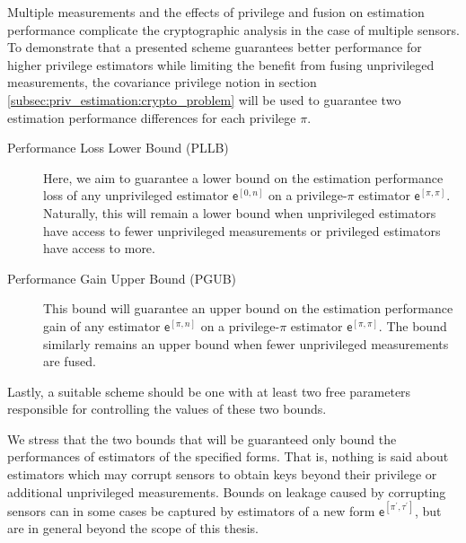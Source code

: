 Multiple measurements and the effects of privilege and fusion on estimation performance complicate the cryptographic analysis in the case of multiple sensors. To demonstrate that a presented scheme guarantees better performance for higher privilege estimators while limiting the benefit from fusing unprivileged measurements, the covariance privilege notion in section \ref{subsec:priv_estimation:crypto_problem} will be used to guarantee two estimation performance differences for each privilege $\pi$.
\begin{description}
    \item[Performance Loss Lower Bound (PLLB)] Here, we aim to guarantee a lower bound on the estimation performance loss of any unprivileged estimator $\mathsf{e}^{[0, n]}$ on a privilege-$\pi$ estimator $\mathsf{e}^{[\pi,\pi]}$. Naturally, this will remain a lower bound when unprivileged estimators have access to fewer unprivileged measurements or privileged estimators have access to more.
    \item[Performance Gain Upper Bound (PGUB)] This bound will guarantee an upper bound on the estimation performance gain of any estimator $\mathsf{e}^{[\pi, n]}$ on a privilege-$\pi$ estimator $\mathsf{e}^{[\pi,\pi]}$. The bound similarly remains an upper bound when fewer unprivileged measurements are fused.
\end{description}
Lastly, a suitable scheme should be one with at least two free parameters responsible for controlling the values of these two bounds.
\begin{remark}
  We stress that the two bounds that will be guaranteed only bound the performances of estimators of the specified forms. That is, nothing is said about estimators which may corrupt sensors to obtain keys beyond their privilege or additional unprivileged measurements. Bounds on leakage caused by corrupting sensors can in some cases be captured by estimators of a new form $\mathsf{e}^{[\pi^\prime,\tau^\prime]}$, but are in general beyond the scope of this thesis.
\end{remark}


% 
%                                                                                
%                                                                                
%                                                                                
% 


